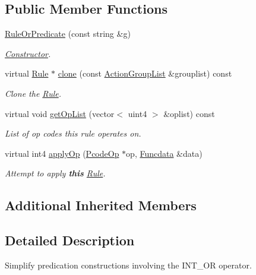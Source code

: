 \subsection*{Public Member Functions}
\begin{DoxyCompactItemize}
\item 
\mbox{\hyperlink{class_rule_or_predicate_aafc3664581fdf2f48313e070addaad31}{Rule\+Or\+Predicate}} (const string \&g)
\begin{DoxyCompactList}\small\item\em \mbox{\hyperlink{class_constructor}{Constructor}}. \end{DoxyCompactList}\item 
virtual \mbox{\hyperlink{class_rule}{Rule}} $\ast$ \mbox{\hyperlink{class_rule_or_predicate_a190f266ab1a951a70b6413460c48f0fa}{clone}} (const \mbox{\hyperlink{class_action_group_list}{Action\+Group\+List}} \&grouplist) const
\begin{DoxyCompactList}\small\item\em Clone the \mbox{\hyperlink{class_rule}{Rule}}. \end{DoxyCompactList}\item 
virtual void \mbox{\hyperlink{class_rule_or_predicate_a40ca266acf32380c57cd5964d8f94adb}{get\+Op\+List}} (vector$<$ uint4 $>$ \&oplist) const
\begin{DoxyCompactList}\small\item\em List of op codes this rule operates on. \end{DoxyCompactList}\item 
virtual int4 \mbox{\hyperlink{class_rule_or_predicate_ae9bd9f602cf43e10c02623d2ee5e6fc7}{apply\+Op}} (\mbox{\hyperlink{class_pcode_op}{Pcode\+Op}} $\ast$op, \mbox{\hyperlink{class_funcdata}{Funcdata}} \&data)
\begin{DoxyCompactList}\small\item\em Attempt to apply {\bfseries{this}} \mbox{\hyperlink{class_rule}{Rule}}. \end{DoxyCompactList}\end{DoxyCompactItemize}
\subsection*{Additional Inherited Members}


\subsection{Detailed Description}
Simplify predication constructions involving the I\+N\+T\+\_\+\+OR operator. 

